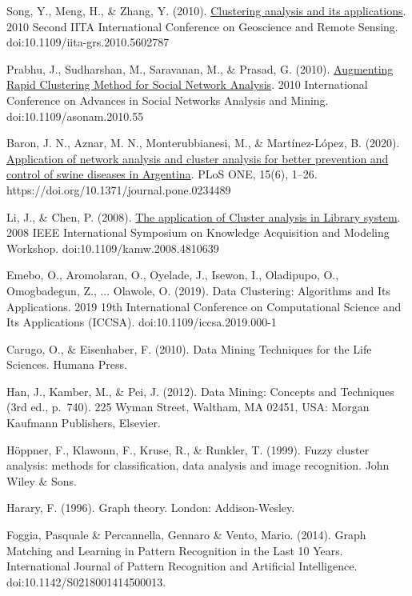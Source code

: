 \documentclass[10pt, a4paper]{article}
\begin{document}
\begin{thebibliography}{X}
 Song, Y., Meng, H., \& Zhang, Y. (2010). \href{https://ieeexplore.ieee.org/document/5602787} {Clustering analysis and its applications}. 2010 Second IITA International Conference on Geoscience and Remote Sensing. doi:10.1109/iita-grs.2010.5602787

 Prabhu, J., Sudharshan, M., Saravanan, M., \& Prasad, G. (2010). \href{https://ieeexplore.ieee.org/document/5563072} {Augmenting Rapid Clustering Method for Social Network Analysis}. 2010 International Conference on Advances in Social Networks Analysis and Mining. doi:10.1109/asonam.2010.55

 Baron, J. N., Aznar, M. N., Monterubbianesi, M., \& Martínez-López, B. (2020). \href{https://search.ebscohost.com/login.aspx?direct=true&db=aph&AN=143827917&lang=es&site=ehost-live&scope=site} {Application of network analysis and cluster analysis for better prevention and control of swine diseases in Argentina}. PLoS ONE, 15(6), 1–26. https://doi.org/10.1371/journal.pone.0234489

 Li, J., \& Chen, P. (2008). \href{https://ieeexplore.ieee.org/document/4810639} {The application of Cluster analysis in Library system}. 2008 IEEE International Symposium on Knowledge Acquisition and Modeling Workshop. doi:10.1109/kamw.2008.4810639

 Emebo, O., Aromolaran, O., Oyelade, J., Isewon, I., Oladipupo, O., Omogbadegun, Z., ... Olawole, O. (2019). Data Clustering: Algorithms and Its Applications. 2019 19th International Conference on Computational Science and Its Applications (ICCSA). doi:10.1109/iccsa.2019.000-1

 Carugo, O., \& Eisenhaber, F. (2010). Data Mining Techniques for the Life Sciences. Humana Press.

Han, J., Kamber, M., \& Pei, J. (2012). Data Mining: Concepts and Techniques (3rd ed., p.~740). 225 Wyman Street, Waltham, MA 02451, USA: Morgan Kaufmann Publishers, Elsevier.

 Höppner, F., Klawonn, F., Kruse, R., \& Runkler, T. (1999). Fuzzy cluster analysis: methods for classification, data analysis and image recognition. John Wiley \& Sons.

 Harary, F. (1996). Graph theory. London: Addison-Wesley.

 Foggia, Pasquale \& Percannella, Gennaro \& Vento, Mario. (2014). Graph Matching and Learning in Pattern Recognition in the Last 10 Years. International Journal of Pattern Recognition and Artificial Intelligence. doi:10.1142/S0218001414500013. 


\end{thebibliography}
\end{document}
